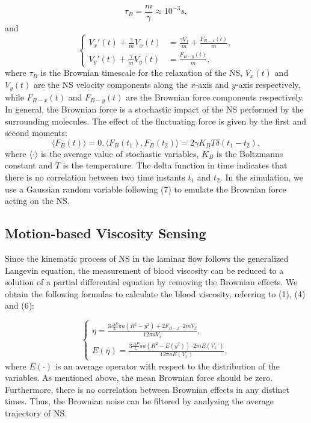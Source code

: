 \documentclass[conference]{IEEEtran}
\begin{document}
\begin{equation}
\label{eq3}
 \tau_B = {\frac{m}{\gamma}} \approx 10^{-3} s,
\end{equation}
and
\begin{equation}
\label{eq4}
\left\{
\begin{aligned}
  V_x'(t) + {\frac{\gamma}{m}} V_x(t) &= 
	{\frac{\gamma V_f}{m}} + {\frac{ F_{B-x} (t) }{m}},
  \\
  V_y'(t) + {\frac{\gamma}{m}} V_y(t) &= 
	 {\frac{ F_{B-y} (t) }{m}},
\end {aligned}
\right.
\end{equation}
where $\tau_B$ is the Brownian timescale for the relaxation of the NS, $ V_x(t)$ and $ V_y(t)$ are the NS velocity components along the $x$-axis and $y$-axis respectively, while $F_{B-x}(t)$ and $F_{B-y}(t)$ are the Brownian force components respectively. In general, the Brownian force is a stochastic impact of the NS performed by the surrounding molecules. The effect of the fluctuating force is given by the first and second moments:
\begin{equation}
\label{eq5}
\langle F_{B}(t) \rangle=0  ,  \langle F_{B}(t_1) , F_{B}(t_2) \rangle = 2 \gamma K_B T \delta (t_1-t_2),
\end{equation}
where $\langle \cdot \rangle$ is the average value of stochastic variables, $K_B$ is the Boltzmanns constant and $T$ is the temperature. The delta function in time indicates that there is no correlation between two time instants $t_1$ and $t_2$. In the simulation, we use a Gaussian random variable following (7) to emulate the Brownian force acting on the NS.

\subsection { Motion-based Viscosity Sensing }

Since the kinematic process of NS in the laminar flow follows the generalized Langevin equation, the measurement of blood viscosity can be reduced to a solution of a partial differential equation by removing the Brownian effects. We obtain the following formulas to calculate the blood viscosity, referring to (1), (4) and (6):

\begin{equation}
\label{eq6}
\left\{
\begin{aligned}
  \eta=
{
\frac{3 {\frac{\Delta P}{L}} \pi a (R^{2}-y^{2}) + 2 F_{B-x} – 2 m V_x }
{12 \pi a V_x}
},
  \\
  E(\eta)=
{
\frac{3 {\frac{\Delta P}{L}} \pi a (R^{2}-E(y^{2}))  – 2 m E(V_x') }
{12 \pi a E(V_x)}
},
\end {aligned}
\right.
\end{equation}
where $E(\cdot)$ is an average operator with respect to the distribution of the variables. As mentioned above, the mean Brownian force should be zero. Furthermore, there is no correlation between Brownian effects in any distinct times. Thus, the Brownian noise can be filtered by analyzing the average trajectory of NS.
\end{document}
